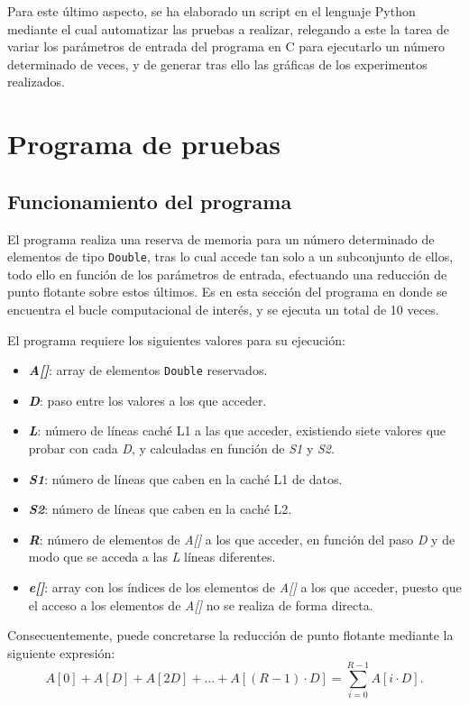 \documentclass[conference]{IEEEtran}
\begin{document}
Para este último aspecto, se ha elaborado un script en el lenguaje Python mediante el cual automatizar las pruebas a realizar, relegando a este la tarea de variar los parámetros de entrada del programa en C para ejecutarlo un número determinado de veces, y de generar tras ello las gráficas de los experimentos realizados.

\section{Programa de pruebas} \label{tipoExperimento}

\subsection{Funcionamiento del programa}
El programa realiza una reserva de memoria para un número determinado de elementos de tipo \texttt{Double}, tras lo cual accede tan solo a un subconjunto de ellos, todo ello en función de los parámetros de entrada, efectuando una reducción de punto flotante sobre estos últimos. Es en esta sección del programa en donde se encuentra el bucle computacional de interés, y se ejecuta un total de 10 veces.

El programa requiere los siguientes valores para su ejecución:
\begin{itemize}
\item \textbf{\textit{A[]}}: array de elementos \texttt{Double} reservados.
\item \textbf{\textit{D}}: paso entre los valores a los que acceder.
\item \textbf{\textit{L}}: número de líneas caché L1 a las que acceder, existiendo siete valores que probar con cada \textit{D}, y calculadas en función de \textit{S1} y \textit{S2}.
\item \textbf{\textit{S1}}: número de líneas que caben en la caché L1 de datos.
\item \textbf{\textit{S2}}: número de líneas que caben en la caché L2.
\item \textbf{\textit{R}}: número de elementos de \textit{A[]} a los que acceder, en función del paso \textit{D} y de modo que se acceda a las \textit{L} líneas diferentes.
\item \textbf{\textit{e[]}}: array con los índices de los elementos de \textit{A[]} a los que acceder, puesto que el acceso a los elementos de \textit{A[]} no se realiza de forma directa.
\end{itemize}

Consecuentemente, puede concretarse la reducción de punto flotante mediante la siguiente expresión:
\begin{equation*}
	    A[0] + A[D] + A[2D] + ... + A[(R-1)\cdot D] = \sum_{i=0}^{R-1}A[i\cdot D].
\end{equation*}
\end{document}

